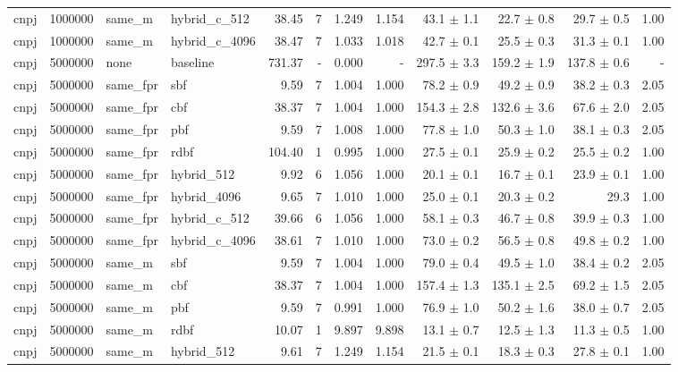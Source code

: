 \begin{tabular}{llllrrrrrrrr}
cnpj & 1000000 & same\_m & hybrid\_c\_512 & 38.45 & 7 & 1.249 & 1.154 & 43.1 $\pm$ 1.1 & 22.7 $\pm$ 0.8 & 29.7 $\pm$ 0.5 & 1.00 \\
cnpj & 1000000 & same\_m & hybrid\_c\_4096 & 38.47 & 7 & 1.033 & 1.018 & 42.7 $\pm$ 0.1 & 25.5 $\pm$ 0.3 & 31.3 $\pm$ 0.1 & 1.00 \\
cnpj & 5000000 & none & baseline & 731.37 & - & 0.000 & - & 297.5 $\pm$ 3.3 & 159.2 $\pm$ 1.9 & 137.8 $\pm$ 0.6 & - \\
cnpj & 5000000 & same\_fpr & sbf & 9.59 & 7 & 1.004 & 1.000 & 78.2 $\pm$ 0.9 & 49.2 $\pm$ 0.9 & 38.2 $\pm$ 0.3 & 2.05 \\
cnpj & 5000000 & same\_fpr & cbf & 38.37 & 7 & 1.004 & 1.000 & 154.3 $\pm$ 2.8 & 132.6 $\pm$ 3.6 & 67.6 $\pm$ 2.0 & 2.05 \\
cnpj & 5000000 & same\_fpr & pbf & 9.59 & 7 & 1.008 & 1.000 & 77.8 $\pm$ 1.0 & 50.3 $\pm$ 1.0 & 38.1 $\pm$ 0.3 & 2.05 \\
cnpj & 5000000 & same\_fpr & rdbf & 104.40 & 1 & 0.995 & 1.000 & 27.5 $\pm$ 0.1 & 25.9 $\pm$ 0.2 & 25.5 $\pm$ 0.2 & 1.00 \\
cnpj & 5000000 & same\_fpr & hybrid\_512 & 9.92 & 6 & 1.056 & 1.000 & 20.1 $\pm$ 0.1 & 16.7 $\pm$ 0.1 & 23.9 $\pm$ 0.1 & 1.00 \\
cnpj & 5000000 & same\_fpr & hybrid\_4096 & 9.65 & 7 & 1.010 & 1.000 & 25.0 $\pm$ 0.1 & 20.3 $\pm$ 0.2 & 29.3 & 1.00 \\
cnpj & 5000000 & same\_fpr & hybrid\_c\_512 & 39.66 & 6 & 1.056 & 1.000 & 58.1 $\pm$ 0.3 & 46.7 $\pm$ 0.8 & 39.9 $\pm$ 0.3 & 1.00 \\
cnpj & 5000000 & same\_fpr & hybrid\_c\_4096 & 38.61 & 7 & 1.010 & 1.000 & 73.0 $\pm$ 0.2 & 56.5 $\pm$ 0.8 & 49.8 $\pm$ 0.2 & 1.00 \\
cnpj & 5000000 & same\_m & sbf & 9.59 & 7 & 1.004 & 1.000 & 79.0 $\pm$ 0.4 & 49.5 $\pm$ 1.0 & 38.4 $\pm$ 0.2 & 2.05 \\
cnpj & 5000000 & same\_m & cbf & 38.37 & 7 & 1.004 & 1.000 & 157.4 $\pm$ 1.3 & 135.1 $\pm$ 2.5 & 69.2 $\pm$ 1.5 & 2.05 \\
cnpj & 5000000 & same\_m & pbf & 9.59 & 7 & 0.991 & 1.000 & 76.9 $\pm$ 1.0 & 50.2 $\pm$ 1.6 & 38.0 $\pm$ 0.7 & 2.05 \\
cnpj & 5000000 & same\_m & rdbf & 10.07 & 1 & 9.897 & 9.898 & 13.1 $\pm$ 0.7 & 12.5 $\pm$ 1.3 & 11.3 $\pm$ 0.5 & 1.00 \\
cnpj & 5000000 & same\_m & hybrid\_512 & 9.61 & 7 & 1.249 & 1.154 & 21.5 $\pm$ 0.1 & 18.3 $\pm$ 0.3 & 27.8 $\pm$ 0.1 & 1.00 \\

\end{tabular}
